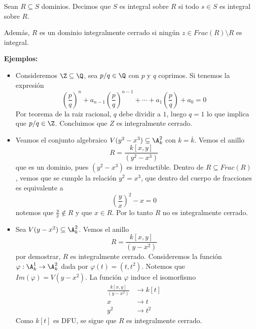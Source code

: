 \documentclass{article}
\begin{document}
\begin{dfn}
    Sean $R\subseteq S$ dominios. Decimos que $S$ es integral sobre $R$ si todo $s\in S$ es 
    integral sobre $R$.
    \vspace{4mm}

    \noindent Además, $R$ es un dominio integralmente cerrado si ningún 
    $z\in Frac(R)\setminus R$ es integral.
\end{dfn}

\noindent\textbf{Ejemplos:}
\begin{itemize}
    \item Consideremos $\Z\subseteq\Q$, sea $p/q\in\Q$ con $p$ y $q$ coprimos. Si tenemos la 
    expresión
    \begin{equation*}
        \left(\frac{p}{q}\right)^{n}+a_{n-1}\left(\frac{p}{q}\right)^{n-1}+
        \cdots+a_{1}\left(\frac{p}{q}\right)+a_{0}=0
    \end{equation*}
    Por teorema de la raiz racional, $q$ debe dividir a $1$, luego $q=1$ lo que implica que 
    $p/q\in\Z$. Concluimos que $Z$ es integralmente cerrado.

    \item Veamos el conjunto algebraico $V(y^{2}-x^{3})\subseteq\A_{k}^{2}$ con $k=\overline{k}$.
    Vemos el anillo
    \begin{equation*}
        R=\frac{k[x,y]}{(y^{2}-x^{3})}
    \end{equation*}
    que es un dominio, pues $(y^{2}-x^{3})$ es irreductible. Dentro de $R\subseteq Frac(R)$, vemos
    que se cumple la relación $y^{2}=x^{3}$, que dentro del cuerpo de fracciones es equivalente a
    \begin{equation*}
        \left(\frac{y}{x}\right)^{2}-x=0
    \end{equation*}
    notemos que $\frac{y}{x}\not\in R$ y que $x\in R$. Por lo tanto $R$ no es integralmente 
    cerrado.

    \item Sea $V(y-x^{2})\subseteq\A_{k}^{2}$. Vemos el anillo
    \begin{equation*}
        R=\frac{k[x,y]}{(y-x^{2})}
    \end{equation*}
    por demostrar, $R$ es integralmente cerrado. Consideremos la función 
    $\varphi:\A_{k}^{1}\to\A_{k}^{2}$ dada por $\varphi(t)=(t,t^{2})$. Notemos que 
    $Im(\varphi)=V(y-x^{2})$. La función $\varphi$ induce el isomorfismo
    \begin{align*}
        \frac{k[x,y]}{(y-x^{2})} &\to k[t] \\
        x &\to t \\
        y^{2} &\to t^{2}
    \end{align*}
    Como $k[t]$ es DFU, se sigue que $R$ es integralmente cerrado.
\end{itemize}
\end{document}
